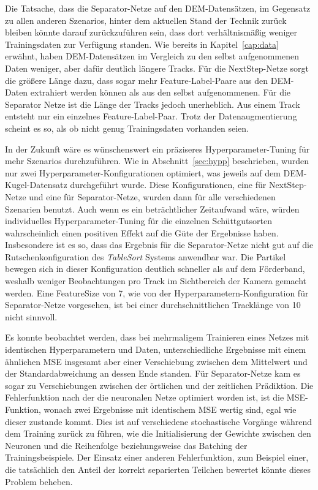 
Die Tatsache, dass die Separator-Netze auf den DEM-Datensätzen, im Gegensatz zu allen anderen Szenarios,
hinter dem aktuellen Stand der Technik zurück bleiben könnte darauf zurückzuführen sein, 
dass dort verhältnismäßig weniger Trainingsdaten zur Verfügung standen.
Wie bereits in Kapitel~\ref{cap:data} erwähnt, haben DEM-Datensätzen im Vergleich zu den selbst aufgenommenen Daten weniger, aber dafür deutlich längere Tracks.
Für die NextStep-Netze sorgt die größere Länge dazu, dass sogar mehr Feature-Label-Paare aus den DEM-Daten extrahiert werden können als aus den selbst aufgenommenen.
Für die Separator Netze ist die Länge der Tracks jedoch unerheblich.
Aus einem Track entsteht nur ein einzelnes Feature-Label-Paar.
Trotz der Datenaugmentierung scheint es so, als ob nicht genug Trainingsdaten vorhanden seien.


In der Zukunft wäre es wünschenswert ein präziseres Hyperparameter-Tuning für mehr Szenarios durchzuführen.
Wie in Abschnitt~\ref{sec:hypp} beschrieben, wurden nur zwei Hyperparameter-Konfigurationen optimiert, was jeweils auf dem DEM-Kugel-Datensatz durchgeführt wurde.
Diese Konfigurationen, eine für NextStep-Netze und eine für Separator-Netze,  wurden dann für alle verschiedenen Szenarien benutzt.
Auch wenn es ein beträchtlicher Zeitaufwand wäre, würden individuelles Hyperparameter-Tuning für die einzelnen Schüttgutsorten wahrscheinlich einen positiven Effekt auf die Güte der Ergebnisse haben.
Insbesondere ist es so, dass das Ergebnis für die Separator-Netze nicht gut auf die Rutschenkonfiguration des \textit{TableSort} Systems anwendbar war.
Die Partikel bewegen sich in dieser Konfiguration deutlich schneller als auf dem Förderband, weshalb weniger Beobachtungen pro Track im Sichtbereich der Kamera gemacht werden.
Eine FeatureSize von 7, wie von der Hyperparametern-Konfiguration für Separator-Netze vorgesehen, ist bei einer durchschnittlichen Tracklänge von 10 nicht sinnvoll.


Es konnte beobachtet werden, dass bei mehrmaligem Trainieren eines Netzes 
mit identischen Hyperparametern und Daten, unterschiedliche Ergebnisse mit einem ähnlichen MSE insgesamt aber einer Verschiebung zwischen dem Mittelwert und der Standardabweichung  
an dessen Ende standen.
Für Separator-Netze kam es sogar zu Verschiebungen zwischen der örtlichen und der zeitlichen Prädiktion.
Die Fehlerfunktion nach der die neuronalen Netze optimiert worden ist, ist die MSE-Funktion, wonach zwei Ergebnisse mit identischem MSE wertig sind, egal wie dieser zustande kommt.
Dies ist auf verschiedene stochastische Vorgänge während dem Training zurück zu führen, wie die Initialisierung der Gewichte zwischen den Neuronen und die Reihenfolge beziehungsweise das Batching der Trainingsbeispiele.
Der Einsatz einer anderen Fehlerfunktion, zum Beispiel einer, die tatsächlich den Anteil der korrekt separierten Teilchen bewertet könnte dieses Problem beheben.
